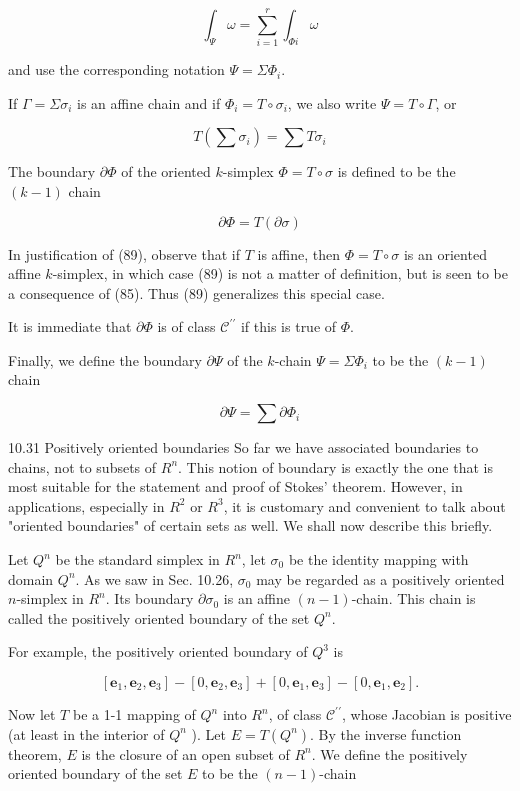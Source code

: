 \documentclass[10pt]{article}
\begin{document}
$$
\int_{\Psi} \omega=\sum_{i=1}^{r} \int_{\Phi i} \omega
$$

and use the corresponding notation $\Psi=\Sigma \Phi_{i}$.

If $\Gamma=\Sigma \sigma_{i}$ is an affine chain and if $\Phi_{i}=T \circ \sigma_{i}$, we also write $\Psi=T \circ \Gamma$, or

$$
T\left(\sum \sigma_{i}\right)=\sum T \sigma_{i}
$$

The boundary $\partial \Phi$ of the oriented $k$-simplex $\Phi=T \circ \sigma$ is defined to be the $(k-1)$ chain

$$
\partial \Phi=T(\partial \sigma)
$$

In justification of (89), observe that if $T$ is affine, then $\Phi=T \circ \sigma$ is an oriented affine $k$-simplex, in which case (89) is not a matter of definition, but is seen to be a consequence of (85). Thus (89) generalizes this special case.

It is immediate that $\partial \Phi$ is of class $\mathscr{C}^{\prime \prime}$ if this is true of $\Phi$.

Finally, we define the boundary $\partial \Psi$ of the $k$-chain $\Psi=\Sigma \Phi_{i}$ to be the $(k-1)$ chain

$$
\partial \Psi=\sum \partial \Phi_{i}
$$

10.31 Positively oriented boundaries So far we have associated boundaries to chains, not to subsets of $R^{n}$. This notion of boundary is exactly the one that is most suitable for the statement and proof of Stokes' theorem. However, in applications, especially in $R^{2}$ or $R^{3}$, it is customary and convenient to talk about "oriented boundaries" of certain sets as well. We shall now describe this briefly.

Let $Q^{n}$ be the standard simplex in $R^{n}$, let $\sigma_{0}$ be the identity mapping with domain $Q^{n}$. As we saw in Sec. 10.26, $\sigma_{0}$ may be regarded as a positively oriented $n$-simplex in $R^{n}$. Its boundary $\partial \sigma_{0}$ is an affine $(n-1)$-chain. This chain is called the positively oriented boundary of the set $Q^{n}$.

For example, the positively oriented boundary of $Q^{3}$ is

$$
\left[\mathbf{e}_{1}, \mathbf{e}_{2}, \mathbf{e}_{3}\right]-\left[0, \mathbf{e}_{2}, \mathbf{e}_{3}\right]+\left[0, \mathbf{e}_{1}, \mathbf{e}_{3}\right]-\left[0, \mathbf{e}_{1}, \mathbf{e}_{2}\right] .
$$

Now let $T$ be a 1-1 mapping of $Q^{n}$ into $R^{n}$, of class $\mathscr{C}^{\prime \prime}$, whose Jacobian is positive (at least in the interior of $Q^{n}$ ). Let $E=T\left(Q^{n}\right)$. By the inverse function theorem, $E$ is the closure of an open subset of $R^{n}$. We define the positively oriented boundary of the set $E$ to be the $(n-1)$-chain
\end{document}
